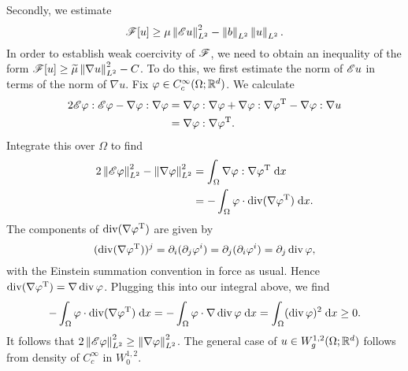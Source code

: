 \begin{example}
    Secondly, we estimate
    \begin{equation} \label{eq:coercivityEstimateForLinearizedElasticity}
        \mathscr{F}[u] \geq \mu \left\lVert {\mathscr{E}u} \right\rVert_{L^2}^2 - \left\lVert {b} \right\rVert_{L^2} \left\lVert {u} \right\rVert_{L^2}.
    \end{equation}
    In order to establish weak coercivity of $\mathscr{F}$, we need to obtain an inequality of the form $\mathscr{F}[u] \geq \widetilde{\mu}\left\lVert {\nabla u} \right\rVert_{L^2}^2 - C$. To do this, we first estimate the norm of $\mathscr{E} u$ in terms of the norm of $\nabla u$. Fix $\varphi \in C_c^\infty(\Omega;\mathbb{R}^d)$. We calculate 
    \begin{equation} \begin{aligned}
        2\mathscr{E} \varphi : \mathscr{E} \varphi - \nabla \varphi : \nabla \varphi &= \nabla \varphi : \nabla \varphi + \nabla \varphi : \nabla \varphi^{\mathrm{T}} - \nabla \varphi : \nabla u \\
                                                             &= \nabla \varphi : \nabla \varphi^{\mathrm{T}}.
    \end{aligned} \end{equation}
    Integrate this over $\Omega$ to find 
    \begin{equation} \begin{aligned}
        2 \left\lVert {\mathscr{E}\varphi} \right\rVert_{L^2}^2 - \left\lVert {\nabla \varphi} \right\rVert_{L^2}^2 &= \int_\Omega \nabla \varphi : \nabla \varphi^{\mathrm{T}} \; \mathrm{d} x \\
                                                                 &= - \int_\Omega \varphi \cdot \operatorname{div}(\nabla \varphi^{\mathrm{T}}) \; \mathrm{d} x. \\
    \end{aligned} \end{equation}
    The components of $\operatorname{div}(\nabla \varphi^{\mathrm{T}})$ are given by 
    \begin{equation}
        (\operatorname{div}(\nabla \varphi^{\mathrm{T}}))^j = \partial_i(\partial_j \varphi^i) = \partial_j(\partial_i \varphi^i) = \partial_j \operatorname{div}{\varphi},
    \end{equation}
    with the Einstein summation convention in force as usual. Hence $\operatorname{div}(\nabla \varphi^{\mathrm{T}}) = \nabla \operatorname{div}{\varphi}$. Plugging this into our integral above, we find 
    \begin{equation} 
        - \int_\Omega \varphi \cdot \operatorname{div}(\nabla \varphi^{\mathrm{T}}) \; \mathrm{d} x = - \int_\Omega \varphi \cdot \nabla \operatorname{div}{\varphi} \; \mathrm{d} x
                                                              = \int_\Omega (\operatorname{div}{\varphi})^2 \; \mathrm{d} x 
                                                              \geq 0.
    \end{equation}
    It follows that $2 \left\lVert {\mathscr{E}\varphi} \right\rVert_{L^2}^2 \geq \left\lVert {\nabla \varphi} \right\rVert_{L^2}^2$. The general case of $u \in W^{1,2}_g(\Omega;\mathbb{R}^d)$ follows from density of $C_c^\infty$ in $W^{1,2}_0$.


\end{example}
